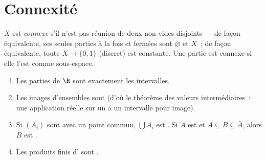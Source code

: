 \section{Connexité}

\begin{definition}\label{def:b3:topology:connected}
$X$ est \emph{connexe} s'il n'est pas
réunion de deux  non vides disjoints --- de façon
équivalente, ses seules parties à la fois  et fermées
sont $\varnothing$ et $X$~; de façon équivalente, toute
 $X \to \{0, 1\}$ (discret) est constante.
Une partie est connexe si elle l'est comme sous-espace.
\end{definition}

\begin{theorem}\label{thm:b3:topology:connectedbasics}
\begin{enumerate}
  \item Les parties  de $\R$ sont exactement les
        intervalles.
  \item Les images  d'ensembles  sont
         (d'où le théorème des valeurs intermédiaires~:
        une application réelle  sur un  a
        un intervalle pour image).
  \item Si $(A_i)$ sont  avec un point commun,
        $\bigcup A_i$ est . Si $A$ est  et $A
        \subseteq B \subseteq \bar A$, alors $B$ est .
  \item Les produits finis d' sont .
\end{enumerate}
\end{theorem}

